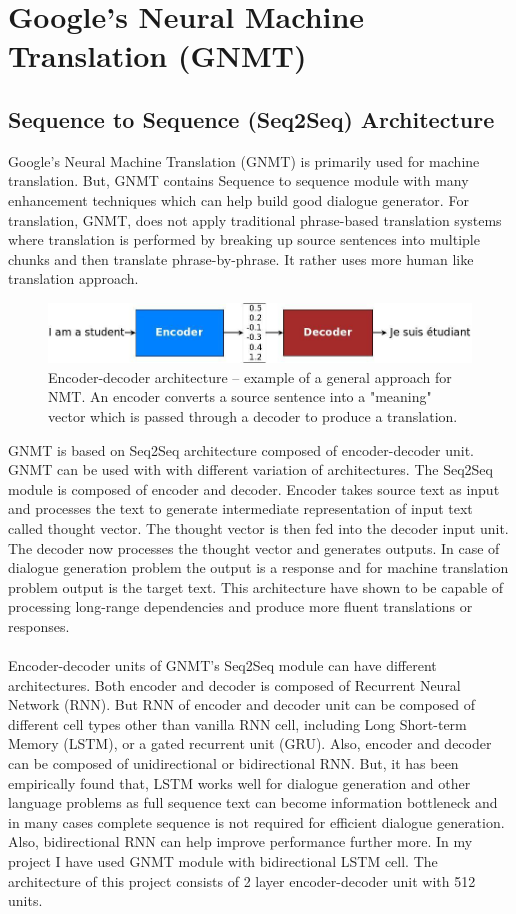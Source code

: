 \documentclass[a4paper,12pt]{report}
\begin{document}
\section {Google's Neural Machine Translation (GNMT)}
\subsection {Sequence to Sequence (Seq2Seq) Architecture}
Google's Neural Machine Translation (GNMT) is primarily used for machine translation. But, GNMT contains Sequence to sequence module with many enhancement techniques which can help build good dialogue generator. For translation, GNMT, does not apply traditional phrase-based translation systems where translation is performed by breaking up source sentences into multiple chunks and then translate phrase-by-phrase. It rather uses more human like translation approach. 
\begin{figure}[H]
\begin{center}
\includegraphics[scale=.5]{encdec}
\caption{Encoder-decoder architecture – example of a general approach for NMT. An encoder converts a source sentence into a "meaning" vector which is passed through a decoder to produce a translation.}
\end{center}
\end{figure}
\noindent GNMT is based on Seq2Seq architecture composed of encoder-decoder unit. GNMT can be used with with different variation of architectures. The Seq2Seq module is composed of encoder and decoder. Encoder takes source text as input and processes the text to generate intermediate representation of input text called thought vector. The thought vector is then fed into the decoder input unit. The decoder now processes the thought vector and generates outputs. In case of dialogue generation problem the output is a response and for machine translation problem output is the target text. This architecture have shown to be capable of processing long-range dependencies and produce more fluent translations or responses.\\\\
Encoder-decoder units of GNMT's Seq2Seq module can have different architectures. Both encoder and decoder is composed of Recurrent Neural Network (RNN). But RNN of encoder and decoder unit can be composed of different cell types other than vanilla RNN cell, including Long Short-term Memory (LSTM), or a gated recurrent unit (GRU). Also, encoder and decoder can be composed of unidirectional or bidirectional RNN. But, it has been empirically found that, LSTM works well for dialogue generation and other language problems as full sequence text can become information bottleneck and in many cases complete sequence is not required for efficient dialogue generation. Also, bidirectional RNN can help improve performance further more. In my project I have used GNMT module with bidirectional LSTM cell. The architecture of this project consists of 2 layer encoder-decoder unit with 512 units.
\end{document}
